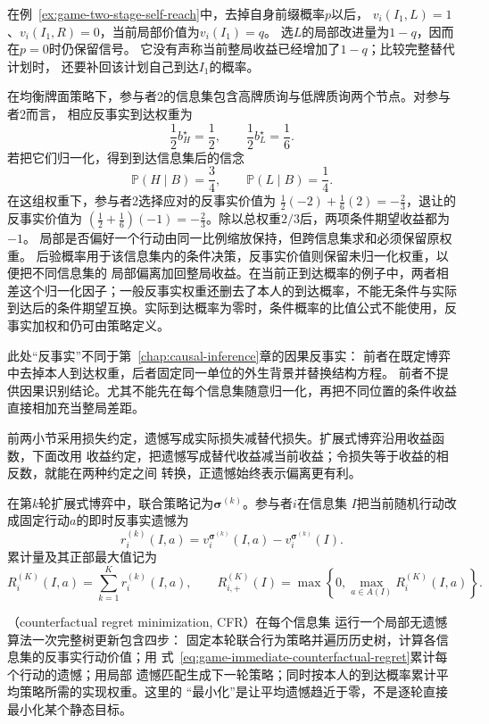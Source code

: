 在例~\ref{ex:game-two-stage-self-reach}中，去掉自身前缀概率$p$以后，
$v_i(I_1,L)=1$、$v_i(I_1,R)=0$，当前局部价值为$v_i(I_1)=q$。
选$L$的局部改进量为$1-q$，因而在$p=0$时仍保留信号。
它没有声称当前整局收益已经增加了$1-q$；比较完整替代计划时，
还要补回该计划自己到达$I_1$的概率。

在均衡牌面策略下，参与者2的信息集包含高牌质询与低牌质询两个节点。对参与者2而言，
相应反事实到达权重为
\[
  \frac12 b_H^\star=\frac12,
  \qquad
  \frac12 b_L^\star=\frac16.
\]
若把它们归一化，得到到达信息集后的信念
\[
  \mathbb{P}(H\mid B)=\frac34,\qquad
  \mathbb{P}(L\mid B)=\frac14.
\]
在这组权重下，参与者2选择应对的反事实价值为
$\frac12(-2)+\frac16(2)=-\frac23$，退让的反事实价值为
$(\frac12+\frac16)(-1)=-\frac23$。除以总权重$2/3$后，两项条件期望收益都为$-1$。
局部是否偏好一个行动由同一比例缩放保持，但跨信息集求和必须保留原权重。
后验概率用于该信息集内的条件决策，反事实价值则保留未归一化权重，以便把不同信息集的
局部偏离加回整局收益。在当前正到达概率的例子中，两者相差这个归一化因子；一般反事实权重还删去了本人的到达概率，不能无条件与实际到达后的条件期望互换。实际到达概率为零时，条件概率的比值公式不能使用，反事实加权和仍可由策略定义。

此处“反事实”不同于第~\ref{chap:causal-inference}章的因果反事实：
前者在既定博弈中去掉本人到达权重，后者固定同一单位的外生背景并替换结构方程。
前者不提供因果识别结论。尤其不能先在每个信息集随意归一化，再把不同位置的条件收益
直接相加充当整局差距。

前两小节采用损失约定，遗憾写成实际损失减替代损失。扩展式博弈沿用收益函数，下面改用
收益约定，把遗憾写成替代收益减当前收益；令损失等于收益的相反数，就能在两种约定之间
转换，正遗憾始终表示偏离更有利。

在第\(k\)轮扩展式博弈中，联合策略记为\(\bm{\sigma}^{(k)}\)。参与者\(i\)在信息集
\(I\)把当前随机行动改成固定行动\(a\)的即时反事实遗憾为
\begin{equation}
  r_i^{(k)}(I,a)
  =
  v_i^{\bm{\sigma}^{(k)}}(I,a)
  -
  v_i^{\bm{\sigma}^{(k)}}(I).
  \label{eq:game-immediate-counterfactual-regret}
\end{equation}
累计量及其正部最大值记为
\[
  R_i^{(K)}(I,a)
  =
  \sum_{k=1}^{K}r_i^{(k)}(I,a),
  \qquad
  R_{i,+}^{(K)}(I)
  =
  \max\left\{0,\max_{a\in A(I)}R_i^{(K)}(I,a)\right\}.
\]

（counterfactual regret minimization, CFR）在每个信息集
运行一个局部无遗憾算法一次完整树更新包含四步：
固定本轮联合行为策略并遍历历史树，计算各信息集的反事实行动价值；用
式~\eqref{eq:game-immediate-counterfactual-regret}累计每个行动的遗憾；用局部
遗憾匹配生成下一轮策略；同时按本人的到达概率累计平均策略所需的实现权重。这里的
“最小化”是让平均遗憾趋近于零，不是逐轮直接最小化某个静态目标。

